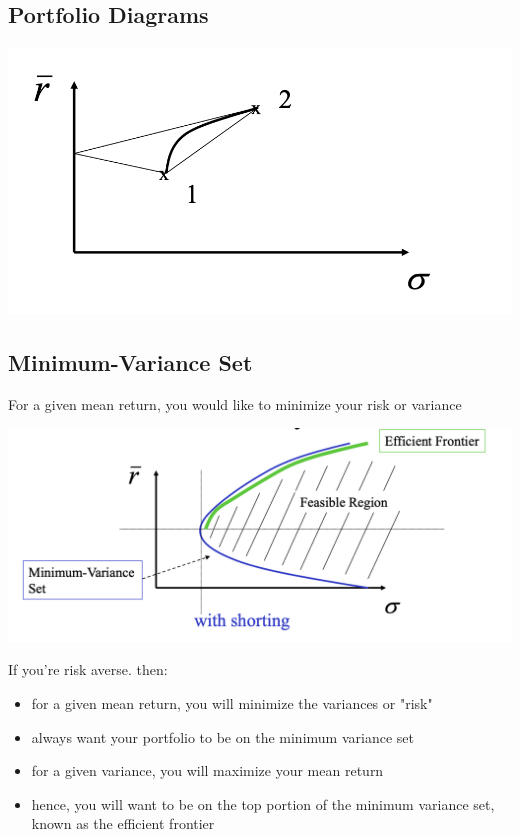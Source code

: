 \documentclass[11pt]{article}
\begin{document}
\subsection{Portfolio Diagrams}
\begin{center}
\includegraphics[scale=0.6]{images/port.png} 
\end{center}

\subsection{Minimum-Variance Set}
For a given mean return, you would like to minimize your risk or variance
\begin{center}
\includegraphics[scale=0.6]{images/minvar.png} 
\end{center}
If you're risk averse. then:
\begin{itemize}
\item for a given mean return, you will minimize the variances or "risk"
\item always want your portfolio to be on the minimum variance set
\item for a given variance, you will maximize your mean return
\item hence, you will want to be on the top portion of the minimum variance set, known as the efficient frontier
\end{itemize}
\end{document}
